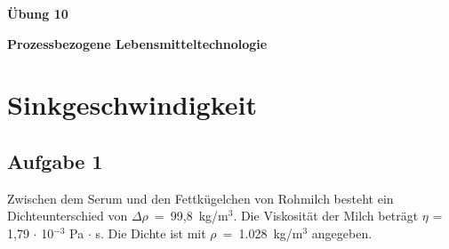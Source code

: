\documentclass[a4paper,11pt]{article}
\begin{document}


\bckgrnd


\begin{center}
\LARGE
\color{white}
\textbf{Übung 10} \par \vspace*{2mm}
\large \color{miugray} \textbf{Prozessbezogene Lebensmitteltechnologie}
\end{center}
\par 
\vspace*{6mm}


\color{miudiutex}
\section*{Sinkgeschwindigkeit}

\subsection*{Aufgabe 1}
Zwischen dem Serum und den Fettkügelchen von Rohmilch besteht ein Dichteunterschied
von \mbox{$\Delta \rho$ = 99,8 kg/m$^3$.} Die Viskosität der Milch beträgt $\eta$ = 1,79 $\cdot$ 10$^{-3}$ Pa $\cdot$ s. Die Dichte ist mit \mbox{$\rho$ = 1.028 kg/m$^3$} angegeben. 
\end{document}
